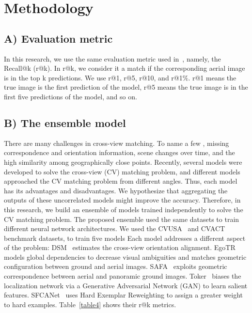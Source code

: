 \documentclass[10pt,letterpaper]{article}
\begin{document}
\section*{Methodology}
\subsection*{A) Evaluation metric}
In this research, we use the same evaluation metric used in~\cite{bib3,bib4,bib5,bib8,bib13,bib14,bib17,bib18,bib19,bib20,bib21,bib22,bib24,bib36,bib43,bib44,bib45,bib46,bib47,bib49,bib50}, namely, the Recall@k (r@k). In r@k, we consider it a match if the corresponding aerial image is in the top k predictions. We use r@1, r@5, r@10, and r@1\%. r@1 means the true image is the first prediction of the model, r@5 means the true image is in the first five predictions of the model, and so on.

\subsection*{B) The ensemble model}

There are many challenges in cross-view matching. To name a few , missing correspondence and orientation information, scene changes over time, and the high similarity among geographically close points. Recently, several models were developed to solve the cross-view (CV) matching problem, and different models approached the CV matching problem from different angles. Thus, each model has its advantages and disadvantages. We hypothesize that aggregating the outputs of these uncorrelated models might improve the accuracy.
Therefore, in this research, we build an ensemble of models trained independently to solve the CV matching problem. The proposed ensemble used the same datasets to train different neural network architectures. We used the CVUSA~\cite{bib55} and CVACT~\cite{bib4} benchmark datasets, to train five models Each model addresses a  different aspect of the problem: DSM~\cite{bib13} estimates the cross-view orientation alignment.  EgoTR~\cite{bib19} models global dependencies to decrease visual ambiguities and matches geometric configuration between ground and aerial images. SAFA~\cite{bib46} exploits geometric correspondence between aerial and panoramic ground images. Toker~\cite{bib18} biases the localization network via a Generative Adversarial Network (GAN) to learn salient features. SFCANet~\cite{bib45} uses Hard Exemplar Reweighting to assign a greater weight to hard examples. Table~\ref{table4} shows their r@k metrics.
\end{document}
